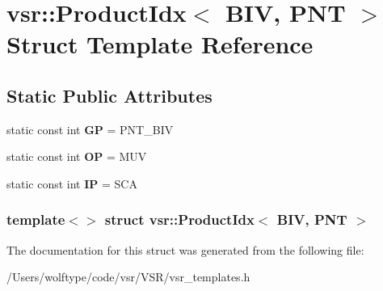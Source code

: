 \hypertarget{structvsr_1_1_product_idx_3_01_b_i_v_00_01_p_n_t_01_4}{\section{vsr\-:\-:Product\-Idx$<$ B\-I\-V, P\-N\-T $>$ Struct Template Reference}
\label{structvsr_1_1_product_idx_3_01_b_i_v_00_01_p_n_t_01_4}
}
\subsection*{Static Public Attributes}
\begin{DoxyCompactItemize}
\item 
\hypertarget{structvsr_1_1_product_idx_3_01_b_i_v_00_01_p_n_t_01_4_aac16cd7058f61ea3561968fc57f54921}{static const int {\bfseries G\-P} = P\-N\-T\-\_\-\-B\-I\-V}\label{structvsr_1_1_product_idx_3_01_b_i_v_00_01_p_n_t_01_4_aac16cd7058f61ea3561968fc57f54921}

\item 
\hypertarget{structvsr_1_1_product_idx_3_01_b_i_v_00_01_p_n_t_01_4_a0512d4c021113b3c5b384b2211aa3783}{static const int {\bfseries O\-P} = M\-U\-V}\label{structvsr_1_1_product_idx_3_01_b_i_v_00_01_p_n_t_01_4_a0512d4c021113b3c5b384b2211aa3783}

\item 
\hypertarget{structvsr_1_1_product_idx_3_01_b_i_v_00_01_p_n_t_01_4_a2e12cf91c12c84dd482747094722e15b}{static const int {\bfseries I\-P} = S\-C\-A}\label{structvsr_1_1_product_idx_3_01_b_i_v_00_01_p_n_t_01_4_a2e12cf91c12c84dd482747094722e15b}

\end{DoxyCompactItemize}
\subsubsection*{template$<$$>$ struct vsr\-::\-Product\-Idx$<$ B\-I\-V, P\-N\-T $>$}



The documentation for this struct was generated from the following file\-:\begin{DoxyCompactItemize}
\item 
/\-Users/wolftype/code/vsr/\-V\-S\-R/vsr\-\_\-templates.\-h\end{DoxyCompactItemize}
